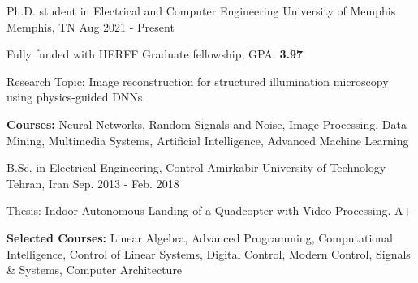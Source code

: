 

\begin{cventries}

  \cventry
    {Ph.D. student in Electrical and Computer Engineering} %
    {University of Memphis} %
    {Memphis, TN} %
    {Aug 2021 - Present} %
    {
      \begin{cvitems} %
        \item {Fully funded with HERFF Graduate fellowship, GPA:\textbf{ 3.97}}
        \item {Research Topic: Image reconstruction for structured illumination microscopy using physics-guided DNNs.}
        \item {\textbf{Courses:} Neural Networks, Random Signals and Noise, Image Processing, Data Mining, Multimedia Systems, Artificial Intelligence, Advanced Machine Learning}
      \end{cvitems}
    }
    
  \cventry
    {B.Sc. in Electrical Engineering, Control} %
    {Amirkabir University of Technology} %
    {Tehran, Iran} %
    {Sep. 2013 - Feb. 2018} %
    {
      \begin{cvitems} %
        \item {Thesis: Indoor Autonomous Landing of a Quadcopter with Video Processing. A+} 
        \item {\textbf{Selected Courses:} Linear Algebra, Advanced Programming, Computational Intelligence, Control of Linear Systems, Digital Control, Modern Control, Signals \& Systems, Computer Architecture}
      \end{cvitems}
        }
    
\end{cventries}
